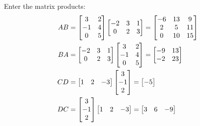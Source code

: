 \documentclass[handout]{ximera}
\begin{document}
\begin{exercise}
\begin{exercise}
Enter the matrix products: 
\begin{align*}
AB &= \begin{bmatrix}  3   &  2\\   -1  &  4\\   0   &  5 \end{bmatrix}
	\begin{bmatrix}   -2  &  3  &  1\\  0  &  2  &  3 \end{bmatrix}
	= \begin{bmatrix}    {-6}  &  {13}  &   {9}\\
	  {2}  &  {5}   & {11}\\  
	  {0}  & {10}  &  {15}  \end{bmatrix} \\
BA &= \begin{bmatrix}   -2  &  3  &  1\\  0  &  2  &  3 \end{bmatrix}
	\begin{bmatrix}  3   &  2\\   -1  &  4\\   0   &  5 \end{bmatrix}
	= \begin{bmatrix}   {-9}  &  {13}\\   {-2}  &  {23}  \end{bmatrix} \\
CD &=  \begin{bmatrix}  1  &   2 &   -3\end{bmatrix}
	\begin{bmatrix} 3\\  -1\\ 2  \end{bmatrix}
	= \begin{bmatrix}  {-5} \end{bmatrix} \\
DC &= \begin{bmatrix} 3\\  -1\\ 2  \end{bmatrix}
	\begin{bmatrix}  1  &   2 &   -3\end{bmatrix}
	= \begin{bmatrix}  {3}  &   {6}  &  {-9}\\

\end{bmatrix}
\end{align*}
\end{exercise}
\end{exercise}
\end{document}
